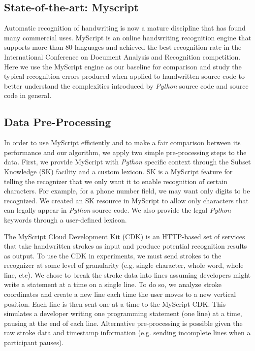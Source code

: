 \documentclass{vgtc}                          %
\begin{document}
\subsection{State-of-the-art: Myscript}
Automatic recognition of handwriting is now a mature discipline that has found many commercial uses\cite{plamondon2000online}. MyScript\cite{myscript} is an online handwriting recognition engine that supports more than 80 languages and achieved the best recognition rate in the International Conference on Document Analysis and Recognition competition\cite{el2011line}.
Here we use the MyScript engine as our baseline for comparison and study the typical recognition errors produced when applied to handwritten source code to better understand the complexities introduced by \textit{Python} source code and source code in general.


\subsection{Data Pre-Processing}

In order to use MyScript efficiently and to make a fair comparison between its performance and our algorithm, we apply two simple pre-processing steps to the data. First, we provide MyScript with \textit{Python} specific context through the Subset Knowledge (SK) facility and a custom lexicon. SK is a MyScript feature for telling the recognizer that we only want it to enable recognition of certain characters. For example, for a phone number field, we may want only digits to be recognized.   We created an SK resource in MyScript to allow only characters that can legally appear in \textit{Python} source code.  We also provide the legal \textit{Python} keywords through a user-defined lexicon.

The MyScript Cloud Development Kit (CDK) is an HTTP-based set of services that take handwritten strokes as input and produce potential recognition results as output. To use the CDK in experiments, we must send strokes to the recognizer at some level of granularity (e.g. single character, whole word, whole line, etc).
We chose to break the stroke data into lines assuming developers might write a statement at a time on a single line. To do so, we analyze stroke coordinates and create a new line each time the user moves to a new vertical position. Each line is then sent one at a time to the MyScript CDK.  This simulates a developer writing one programming statement (one line) at a time, pausing at the end of each line.  Alternative pre-processing is possible given the raw stroke data and timestamp information (e.g. sending incomplete lines when a participant pauses).
\end{document}
